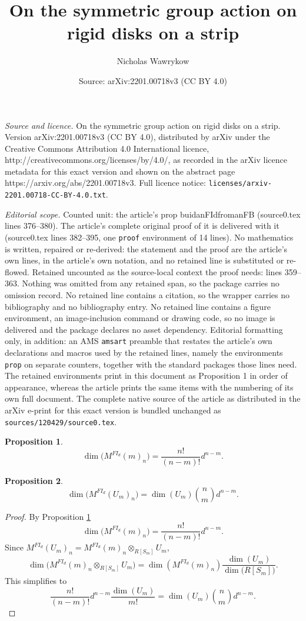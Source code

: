 \documentclass[10pt,a4paper]{amsart}
\title{On the symmetric group action on rigid disks on a strip}
\author{Nicholas Wawrykow}
\date{Source: arXiv:2201.00718v3 (CC BY 4.0)}
\newtheorem{prop}{Proposition}
\begin{document}
\maketitle

\noindent\emph{Source and licence.} On the symmetric group action on rigid disks on a strip. Version arXiv:2201.00718v3 (CC BY 4.0), distributed by arXiv under the Creative Commons Attribution 4.0 International licence, http://creativecommons.org/licenses/by/4.0/, as recorded in the arXiv licence metadata for this exact version and shown on the abstract page https://arxiv.org/abs/2201.00718v3. Full licence notice: \texttt{licenses/arxiv-2201.00718-CC-BY-4.0.txt}.\par\smallskip

\noindent\textit{Editorial scope.} Counted unit: the article's prop buidanFIdfromanFB (source0.tex lines 376--380). The article's complete original proof of it is delivered with it (source0.tex lines 382--395, one \texttt{proof} environment of 14 lines). No mathematics is written, repaired or re-derived: the statement and the proof are the article's own lines, in the article's own notation, and no retained line is substituted or re-flowed.  Retained uncounted as the source-local context the proof needs: lines 359--363.  Nothing was omitted from any retained span, so the package carries no omission record.  No retained line contains a citation, so the wrapper carries no bibliography and no bibliography entry.  No retained line contains a figure environment, an image-inclusion command or drawing code, so no image is delivered and the package declares no asset dependency.  Editorial formatting only, in addition: an AMS \texttt{amsart} preamble that restates the article's own declarations and macros used by the retained lines, namely the environments \texttt{prop} on separate counters, together with the standard packages those lines need.  The retained environments print in this document as Proposition 1 in order of appearance, whereas the article prints the same items with the numbering of its own full document.  The complete native source of the article as distributed in the arXiv e-print for this exact version is bundled unchanged as \texttt{sources/120429/source0.tex}.
\begin{prop}\label{dimofsimpleFId}
\[
\dim\big(M^{FI_{d}}(m)_{n}\big)=\frac{n!}{(n-m)!}d^{n-m}.
\]
\end{prop}

\begin{prop}\label{buidanFIdfromanFB}
\[
\dim\big(M^{FI_{d}}(U_{m})_{n}\big)=\dim(U_{m})\binom{n}{m}d^{n-m}.
\]
\end{prop}

\begin{proof}
By Proposition \ref{dimofsimpleFId} 
\[
\dim(M^{FI_{d}}(m)_{n}\big)=\frac{n!}{(n-m)!}d^{n-m}.
\]
Since $M^{FI_{d}}(U_{m})_{n}=M^{FI_{d}}(m)_{n}\otimes_{R[S_{m}]}U_{m}$,
\[
\dim\big(M^{FI_{d}}(m)_{n}\otimes_{R[S_{m}]}U_{m}\big)=\dim\left(M^{FI_{d}}(m)_{n}\right)\frac{\dim(U_{m})}{\dim\big(R[S_{m}]\big)}.
\]
This simplifies to
\[
\frac{n!}{(n-m)!}d^{n-m}\frac{\dim(U_{m})}{m!}=\dim(U_{m})\binom{n}{m}d^{n-m}.
\]
\end{proof}
\end{document}
